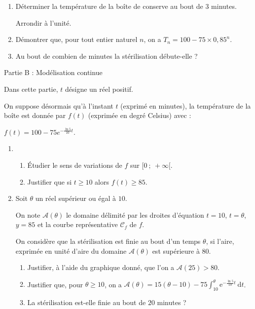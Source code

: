 \begin{enumerate}
     \item
     Déterminer la température de la boîte de conserve au bout de 3 minutes.
     \par
     Arrondir à l'unité.
     \item
     Démontrer que, pour tout entier naturel $n$, on a $T_n = 100-75 \times 0,85^n$.
     \item
     Au bout de combien de minutes la stérilisation débute-elle ?
\end{enumerate}
\begin{h3}Partie B : Modélisation continue\end{h3}
Dans cette partie, $t$ désigne un réel positif.
\par
On suppose désormais qu'à l'instant $t$ (exprimé en minutes), la température de la boîte est donnée par $f(t)$ (exprimée en degré Celsius) avec :
\begin{center}$f(t) = 100-75{e}^{- \frac{\ln 5}{10}t}$.\end{center}
\begin{enumerate}
     \item
     \begin{enumerate}[label=\alph*.]
          \item
          Étudier le sens de variations de $f$ sur $[0~;~+ \infty[$.
          \item
          Justifier que si $t \geqslant 10$ alors $f(t) \geqslant 85$.
     \end{enumerate}
     \item
     Soit $\theta$ un réel supérieur ou égal à $10$.
     \par
     On note $\mathcal{A}(\theta)$ le domaine délimité par les droites d'équation $t = 10$, $t = \theta$, $y = 85$ et la courbe représentative $\mathscr{C}_f$ de $f$.
     \par
     On considère que la stérilisation est finie au bout d'un temps $\theta$, si l'aire, exprimée en unité d'aire du domaine $\mathcal{A}(\theta)$ est supérieure à $80$.

\begin{center}
\end{center}
     \begin{enumerate}
          \item
          Justifier, à l'aide du graphique donné, que l'on a $\mathcal{A}(25) > 80$.
          \item
          Justifier que, pour $\theta \geqslant 10$, on a $\mathcal{A}(\theta) = 15(\theta-10)-75 \int_{10}^{\theta} \text{e}^{- \frac{\ln 5}{10}t}\:\text{d}t$.
          \item
          La stérilisation est-elle finie au bout de $20$ minutes ?
     \end{enumerate}
\end{enumerate}
